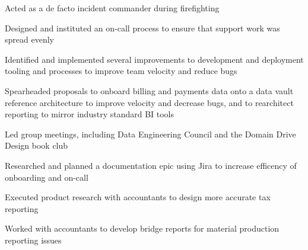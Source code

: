 \begin{job}

  \begin{accomplishments}
    \item Acted as a de facto incident commander during firefighting
    \item Designed and instituted an on-call process to ensure that
    support work was spread evenly
    \item Identified and implemented several improvements to development and
    deployment tooling and processes to improve team velocity and reduce bugs
    \item Spearheaded proposals to onboard billing and payments data onto a data
    vault reference architecture to improve velocity and decrease bugs, and to
    rearchitect reporting to mirror industry standard BI tools
  \end{accomplishments}
  \begin{extendedaccomplishments}
    \item Led group meetings, including Data Engineering Council and the Domain
    Drive Design book club
    \item Researched and planned a documentation epic using Jira to increase
    efficency of onboarding and on-call
    \item Executed product research with accountants to design more accurate tax
    reporting
    \item Worked with accountants to develop bridge reports for material
    production reporting issues
  \end{extendedaccomplishments}
\end{job}
